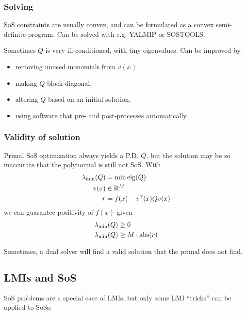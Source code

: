 \subsubsection{Solving}
SoS constraints are usually convex, and can be formulated as a convex semi-definite program. Can be solved with e.g. YALMIP or SOSTOOLS.

Sometimes $Q$ is very ill-conditioned, with tiny eigenvalues. Can be improved by
\begin{itemize}
  \item removing unused monomials from $v(x)$
  \item making $Q$ block-diagonal,
  \item altering $Q$ based on an initial solution,
  \item using software that pre- and post-processes automatically.
\end{itemize}

\subsubsection{Validity of solution}
Primal SoS optimization always yields a P.D. $Q$, but the solution may be so inaccurate that the polynomial is still not SoS. With
%
\begin{gather}
  \begin{split}
    \lambda_{\min}(Q) &= \min \eig(Q) \\
    v(x) &\in \mathbb{R}^M \\
    r &= f(x) - v\tp(x) Q v(x)
  \end{split}
\end{gather}
%
we can guarantee positivity of $f(x)$ given
%
\begin{equation}
  \begin{split}
    \lambda_{\min}(Q) &\geq 0 \\
    \lambda_{\min}(Q) &\geq M \cdot \operatorname{abs}(r)
  \end{split}
\end{equation}

Sometimes, a dual solver will find a valid solution that the primal does not find.

\subsection{LMIs and SoS}
SoS problems are a special case of LMIs, but only some LMI ``tricks'' can be applied to SoSs:

